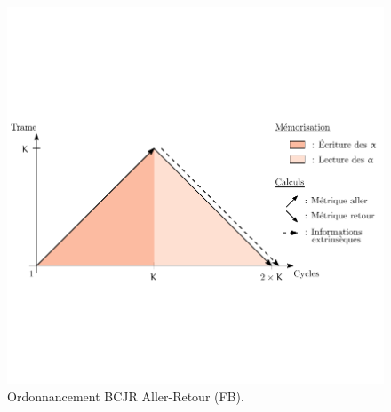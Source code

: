 \begin{figure}[!h]
	\centering
	\includegraphics{main/ch4_fig/ipe/FB+LEG_2.pdf}
	\caption{Ordonnancement BCJR Aller-Retour (FB). \label{fig:siso_seq}}
\end{figure}

